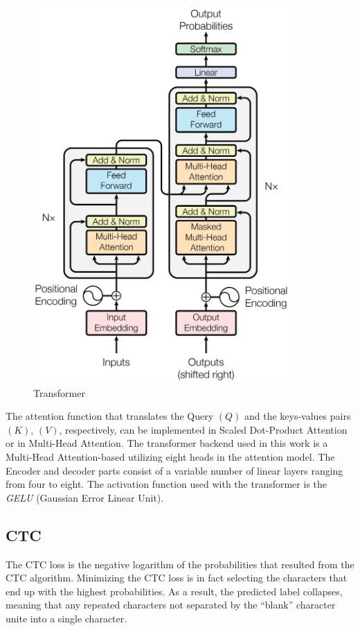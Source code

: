 \begin{figure}[H]
    \centering
    \includegraphics[width=0.75\linewidth]{ASR/images/transformer_blocks}
    \caption{Transformer}\label{fig:transformer_blocks}
\end{figure}

The attention function that translates 
the Query \((Q)\) and the keys-values pairs \((K)\), \((V)\),
respectively, can be implemented in Scaled Dot-Product Attention
or in Multi-Head Attention.
The transformer backend used in this work is
a Multi-Head Attention-based utilizing
eight heads in the attention model. The Encoder 
and decoder parts consist of a variable
number of linear layers ranging from four to eight.
The activation function used
with the transformer is the \emph{GELU} (Gaussian
Error Linear Unit).

\subsection{CTC}
The CTC loss is the negative logarithm of the probabilities that resulted
from the CTC algorithm. Minimizing the CTC loss is in fact selecting
the characters that end up with the highest probabilities. 
As a result, the predicted label collapses, 
meaning that any repeated characters not separated by the 
``blank'' character unite into a single character.

